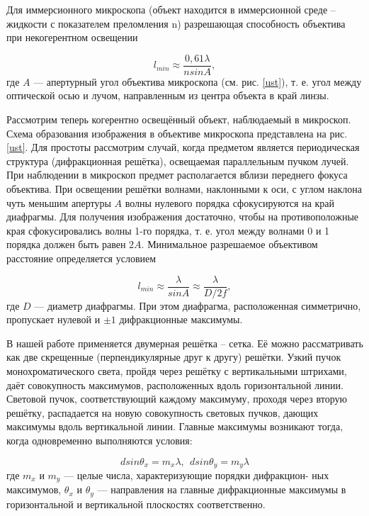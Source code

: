 \documentclass[a4paper,12pt]{article}
\begin{document}
Для иммерсионного микроскопа (объект находится в иммерсионной среде -- жидкости с показателем преломления n) разрешающая способность объектива при некогерентном освещении

\begin{equation*}
    l_{min}\approx\frac{0,61\lambda}{n sin A},
\end{equation*}
где $A$ — апертурный угол объектива микроскопа (см. рис. \ref{ust}), т. е. угол между оптической осью и лучом, направленным из центра объекта в край линзы.

Рассмотрим теперь когерентно освещённый объект, наблюдаемый в микроскоп. Схема образования изображения в объективе микроскопа представлена на рис. \ref{ust}. Для простоты рассмотрим случай, когда предметом является периодическая структура (дифракционная решётка), освещаемая параллельным пучком лучей. При наблюдении в микроскоп предмет располагается вблизи переднего фокуса объектива. При освещении решётки волнами, наклонными к оси, с углом наклона чуть меньшим апертуры $A$ волны нулевого порядка сфокусируются на край диафрагмы. Для получения изображения достаточно, чтобы на противоположные края сфокусировались волны 1-го порядка, т. е. угол между волнами 0 и 1 порядка должен быть равен $2A$. Минимальное разрешаемое объективом расстояние определяется условием

\begin{equation}
    l_{min} \approx\frac{\lambda}{sinA} \approx\frac{\lambda}{D/2f},
    \label{diaf}
\end{equation}
где $D$ — диаметр диафрагмы. При этом диафрагма, расположенная симметрично, пропускает нулевой и $\pm 1$ дифракционные максимумы.


В нашей работе применяется двумерная решётка -- сетка. Её можно рассматривать как две скрещенные (перпендикулярные друг к другу) решётки. Узкий пучок монохроматического света, пройдя через решётку с вертикальными штрихами, даёт совокупность максимумов, расположенных вдоль горизонтальной линии. Световой пучок, соответствующий каждому максимуму, проходя через вторую решётку, распадается на новую совокупность световых пучков, дающих максимумы вдоль вертикальной линии. Главные максимумы возникают тогда, когда одновременно выполняются условия:

\begin{equation}
    dsin\theta_x = m_x\lambda,\  \  dsin\theta_y=m_y\lambda
\end{equation}
где $m_x$ и $m_y$ — целые числа, характеризующие порядки дифракцион- ных максимумов, $\theta_x$ и $\theta_y$ — направления на главные дифракционные максимумы в горизонтальной и вертикальной плоскостях соответственно.
\end{document}
